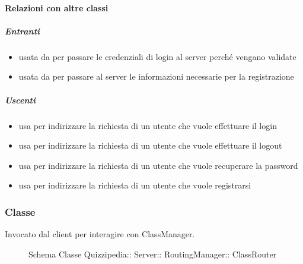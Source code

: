 \paragraph{Relazioni con altre classi}
\subparagraph{Entranti}
\begin{itemize}
\item usata da  per passare le credenziali di login al server perché vengano validate
\item usata da  per passare al server le informazioni necessarie per la registrazione
\end{itemize}
\subparagraph{Uscenti}
\begin{itemize}
\item usa  per indirizzare la richiesta di un utente che vuole effettuare il login
\item usa  per indirizzare la richiesta di un utente che vuole effettuare il logout
\item usa  per indirizzare la richiesta di un utente che vuole recuperare la password
\item usa  per indirizzare la richiesta di un utente che vuole registrarsi
\end{itemize}
\subsubsection{Classe }
Invocato dal client per interagire con ClassManager.
\begin{figure}[H]
\centering
\noindent{}
\caption[Schema Classe ClassRouter]{Schema Classe Quizzipedia:: Server:: RoutingManager:: ClassRouter}
\end{figure}
